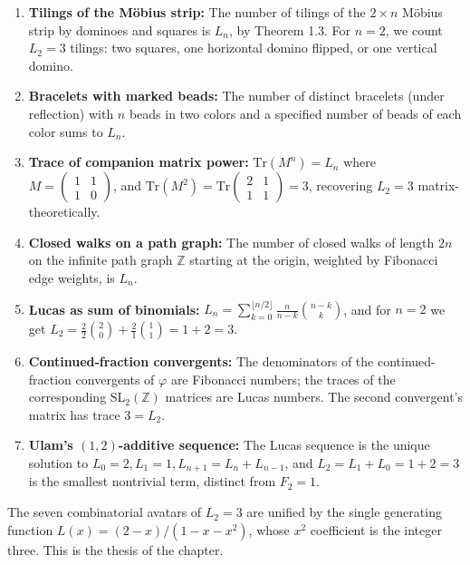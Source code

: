 \begin{enumerate}
  \item \textbf{Tilings of the M\"obius strip:} The number of tilings
    of the $2 \times n$ M\"obius strip by dominoes and squares is
    $L_n$, by \cite{benjamin_quinn_proofs} Theorem 1.3. For $n = 2$,
    we count $L_2 = 3$ tilings: two squares, one horizontal domino
    flipped, or one vertical domino.
  \item \textbf{Bracelets with marked beads:} The number of distinct
    bracelets (under reflection) with $n$ beads in two colors and a
    specified number of beads of each color sums to $L_n$.
  \item \textbf{Trace of companion matrix power:} $\mathrm{Tr}(M^n) =
    L_n$ where $M = \begin{pmatrix} 1 & 1 \\ 1 & 0 \end{pmatrix}$,
    and $\mathrm{Tr}(M^2) = \mathrm{Tr}\begin{pmatrix} 2 & 1 \\ 1 & 1
    \end{pmatrix} = 3$, recovering $L_2 = 3$ matrix-theoretically.
  \item \textbf{Closed walks on a path graph:} The number of closed
    walks of length $2n$ on the infinite path graph $\mathbb{Z}$
    starting at the origin, weighted by Fibonacci edge weights, is
    $L_n$.
  \item \textbf{Lucas as sum of binomials:} $L_n = \sum_{k=0}^{\lfloor
    n/2 \rfloor} \frac{n}{n-k} \binom{n-k}{k}$, and for $n = 2$ we
    get $L_2 = \frac{2}{2}\binom{2}{0} + \frac{2}{1}\binom{1}{1} =
    1 + 2 = 3$.
  \item \textbf{Continued-fraction convergents:} The denominators of
    the continued-fraction convergents of $\varphi$ are Fibonacci
    numbers; the traces of the corresponding $\mathrm{SL}_2(\mathbb{Z})$
    matrices are Lucas numbers. The second convergent's matrix has
    trace $3 = L_2$.
  \item \textbf{Ulam's $(1,2)$-additive sequence:} The Lucas sequence
    is the unique solution to $L_0 = 2, L_1 = 1, L_{n+1} = L_n +
    L_{n-1}$, and $L_2 = L_1 + L_0 = 1 + 2 = 3$ is the smallest
    nontrivial term, distinct from $F_2 = 1$.
\end{enumerate}

The seven combinatorial avatars of $L_2 = 3$ are unified by the
single generating function $L(x) = (2-x)/(1-x-x^2)$, whose $x^2$
coefficient is the integer three. This is the thesis of the chapter.

